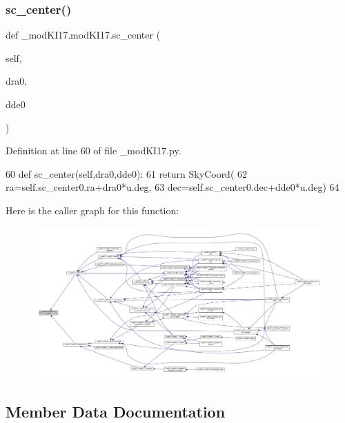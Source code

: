 \subsubsection{\texorpdfstring{sc\+\_\+center()}{sc\_center()}}
{\footnotesize\ttfamily def \+\_\+mod\+K\+I17.\+mod\+K\+I17.\+sc\+\_\+center (\begin{DoxyParamCaption}\item[{}]{self,  }\item[{}]{dra0,  }\item[{}]{dde0 }\end{DoxyParamCaption})}



Definition at line 60 of file \+\_\+mod\+K\+I17.\+py.


\begin{DoxyCode}
60     \textcolor{keyword}{def }sc\_center(self,dra0,dde0):
61         \textcolor{keywordflow}{return} SkyCoord(
62             ra=self.sc\_center0.ra+dra0*u.deg,
63             dec=self.sc\_center0.dec+dde0*u.deg)
64         
\end{DoxyCode}
Here is the caller graph for this function\+:\nopagebreak
\begin{figure}[H]
\begin{center}
\leavevmode
\includegraphics[width=350pt]{d8/d2c/class__modKI17_1_1modKI17_af5fe9e0c29dd12a9a11e5b00f6fc481e_icgraph}
\end{center}
\end{figure}


\subsection{Member Data Documentation}
\mbox{\label{class__modKI17_1_1modKI17_af6ac5b5f8bcdf3168ac3d0b6530e512d}} 
